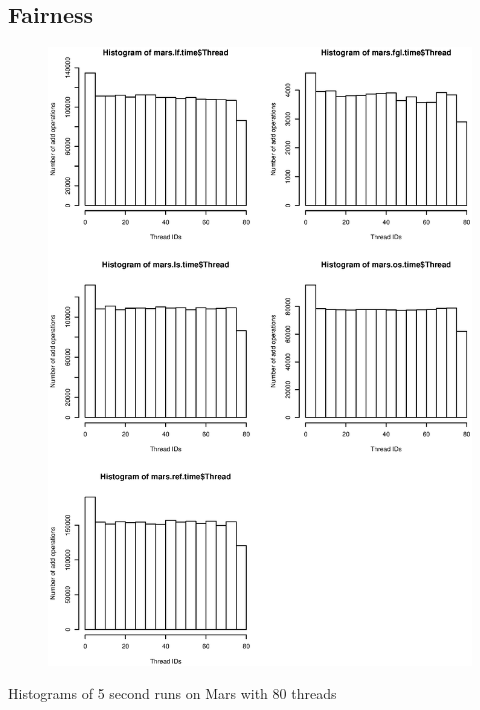 \subsection{Fairness}
\begin{figure}[H]
  \centering 
  \includegraphics[height=0.90\textheight]{pictures/mars_fairness_plot.eps}
  \label{marsfairness}
\end{figure}
Histograms of 5 second runs on Mars with 80 threads



